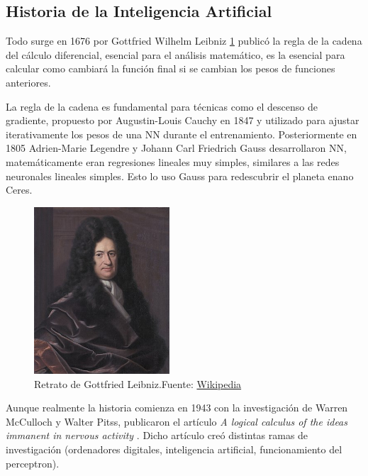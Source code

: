 \newpage
\subsection{Historia de la Inteligencia Artificial}

Todo surge en 1676 por {Gottfried Wilhelm Leibniz} \ref{fig:gottfried-leibniz} publicó la regla de la cadena del cálculo diferencial, esencial para el análisis matemático, es la esencial para calcular como cambiará la función final si se cambian los pesos de funciones anteriores.

La regla de la cadena es fundamental para técnicas como el descenso de gradiente, propuesto por {Augustin-Louis Cauchy} en 1847 y utilizado para ajustar iterativamente los pesos de una \acrshort{NN} durante el entrenamiento.
Posteriormente en 1805 {Adrien-Marie Legendre} y {Johann Carl Friedrich Gauss} desarrollaron \acrshort{NN}, matemáticamente eran regresiones lineales muy simples, similares a las redes neuronales lineales simples.
Esto lo uso {Gauss} para redescubrir el planeta enano Ceres.

\begin{figure}[H]
    \centering
    \includegraphics[width=0.45\textwidth]{figures/Gottfried_Wilhelm_Leibniz,_Bernhard_Christoph_Francke.jpg}
    \caption{Retrato de Gottfried Leibniz.\newline{}Fuente: \href{https://es.wikipedia.org/wiki/Gottfried_Leibniz}{Wikipedia}}
    \label{fig:gottfried-leibniz}
\end{figure}

Aunque realmente la historia comienza en 1943 con la investigación de {Warren McCulloch} y {Walter Pitss}, publicaron el artículo \textit{A logical calculus of the ideas immanent in nervous activity} \cite{mcculloch1943logical}.
Dicho artículo creó distintas ramas de investigación (ordenadores digitales, inteligencia artificial, funcionamiento del perceptron).

